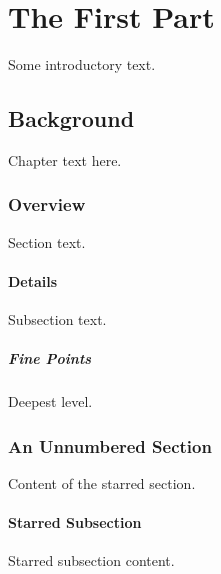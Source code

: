 \part{The First Part}

Some introductory text.

\chapter{Background}

Chapter text here.

\section{Overview}

Section text.

\subsection{Details}

Subsection text.

\subsubsection{Fine Points}

Deepest level.

\section*{An Unnumbered Section}

Content of the starred section.

\subsection*{Starred Subsection}

Starred subsection content.

